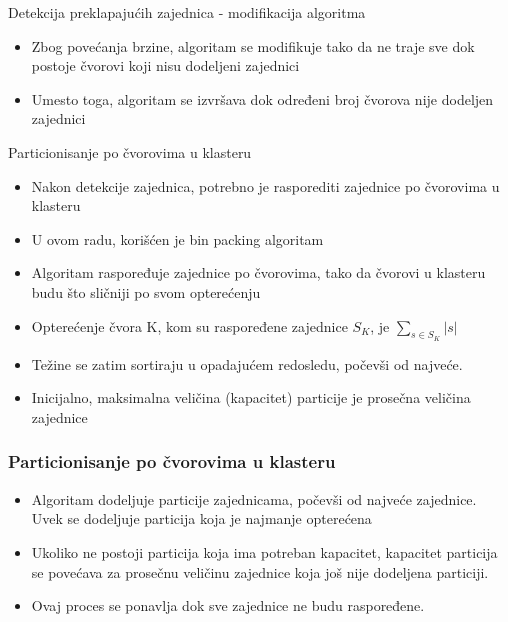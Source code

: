 \documentclass{beamer}
\begin{document}
\begin{frame}{Detekcija preklapajućih zajednica - modifikacija algoritma}
    \begin{itemize}
        \item Zbog povećanja brzine, algoritam se modifikuje tako da ne traje sve dok postoje čvorovi koji nisu dodeljeni zajednici
        \item Umesto toga, algoritam se izvršava dok određeni broj čvorova nije dodeljen zajednici
    \end{itemize}
\end{frame}

\begin{frame}{Particionisanje po čvorovima u klasteru}
    \begin{itemize}
        \item Nakon detekcije zajednica, potrebno je rasporediti zajednice po čvorovima u klasteru
        \item U ovom radu, korišćen je bin packing algoritam
        \item Algoritam raspoređuje zajednice po čvorovima, tako da čvorovi u klasteru budu što sličniji po svom opterećenju
        \item Opterećenje čvora K, kom su raspoređene zajednice $ S_K $, je $ \sum_{s \in S_K} |s| $
        \item Težine se zatim sortiraju u opadajućem redosledu, počevši od najveće.
        \item Inicijalno, maksimalna veličina (kapacitet) particije je prosečna veličina zajednice 
    \end{itemize}
\end{frame}

\begin{frame}
    \frametitle{Particionisanje po čvorovima u klasteru}
    \begin{itemize}
        \item Algoritam dodeljuje particije zajednicama, počevši od najveće zajednice. Uvek se dodeljuje particija koja je najmanje opterećena
        \item Ukoliko ne postoji particija koja ima potreban kapacitet, kapacitet particija se povećava za prosečnu veličinu zajednice koja još nije dodeljena particiji. 
        \item Ovaj proces se ponavlja dok sve zajednice ne budu raspoređene.
    \end{itemize}
\end{frame}
\end{document}
